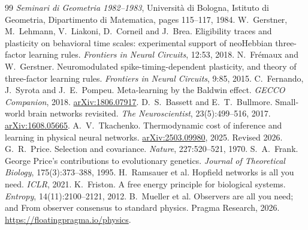 \documentclass[11pt]{article}
\theoremstyle{definition}
\theoremstyle{remark}
\begin{document}
\begin{thebibliography}{99}
\emph{Seminari di Geometria 1982--1983}, Universit\`a di Bologna, Istituto di Geometria, Dipartimento
di Matematica, pages 115--117, 1984.
 W.~Gerstner, M.~Lehmann, V.~Liakoni, D.~Corneil and J.~Brea. Eligibility traces
and plasticity on behavioral time scales: experimental support of neoHebbian three-factor learning
rules. \emph{Frontiers in Neural Circuits}, 12:53, 2018.
 N.~Fr\'emaux and W.~Gerstner. Neuromodulated spike-timing-dependent plasticity,
and theory of three-factor learning rules. \emph{Frontiers in Neural Circuits}, 9:85, 2015.
 C.~Fernando, J.~Syrota and J.~E.~Pompeu. Meta-learning by the Baldwin effect.
\emph{GECCO Companion}, 2018. \href{https://arxiv.org/abs/1806.07917}{arXiv:1806.07917}.
 D.~S.~Bassett and E.~T.~Bullmore. Small-world brain networks revisited.
\emph{The Neuroscientist}, 23(5):499--516, 2017. \href{https://arxiv.org/abs/1608.05665}{arXiv:1608.05665}.
 A.~V.~Tkachenko. Thermodynamic cost of inference and learning in physical
neural networks. \href{https://arxiv.org/abs/2503.09980}{arXiv:2503.09980}, 2025. Revised 2026.
 G.~R.~Price. Selection and covariance. \emph{Nature}, 227:520--521, 1970.
 S.~A.~Frank. George Price's contributions to evolutionary genetics. \emph{Journal of
Theoretical Biology}, 175(3):373--388, 1995.
 H.~Ramsauer et al. Hopfield networks is all you need. \emph{ICLR}, 2021.
 K.~Friston. A free energy principle for biological systems. \emph{Entropy},
14(11):2100--2121, 2012.
 B.~Mueller et al. Observers are all you need; and From observer consensus to standard
physics. Pragma Research, 2026. \url{https://floatingpragma.io/physics}.
\end{thebibliography}
\end{document}
